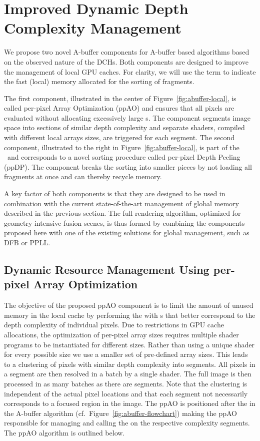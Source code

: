 \documentclass{egpubl}
\newcommand{\ab}{\mbox{A-buffer}}
\newcommand{\dch}{DCH}
\newcommand{\stencil}{ppAO}
\newcommand{\dloop}{ppDP}
\begin{document}
\section{Improved Dynamic Depth Complexity Management}
\label{sec:oit-local}

We propose two novel \ab{} components for \ab{} based algorithms based on the observed nature of the \dch{}s. 
Both components are designed to improve the management of local GPU caches. 
For clarity, we will use the term \bArray{} to indicate the fast (local) memory allocated for the sorting of fragments. 

The first component, illustrated in the center of Figure~\ref{fig:abuffer-local}, is called {per-pixel Array Optimization} (\stencil) and ensures that all pixels are evaluated without allocating excessively large \bArray{}s. 
The component segments image space into sections of similar depth complexity and separate shaders, compiled with different local arrays sizes, are triggered for each segment. 
The second component, illustrated to the right in Figure~\ref{fig:abuffer-local}, is part of the \sResolve\ and corresponds to a novel sorting procedure called per-pixel Depth Peeling (\dloop).
The component breaks the sorting into smaller pieces by not loading all fragments at once and can thereby recycle memory. 

A key factor of both components is that they are designed to be used in combination with the current state-of-the-art management of global memory described in the previous section. 
The full rendering algorithm, optimized for geometry intensive fusion scenes, is thus formed by combining the components proposed here with one of the existing solutions for global management, such as DFB or PPLL. 


\subsection{Dynamic Resource Management Using per-pixel Array Optimization}
\label{sec:ppao}

The objective of the proposed \stencil{} component is to limit the amount of unused memory in the local cache by performing the \sResolve{} with \bArray{}s that better correspond to the depth complexity of individual pixels. 
Due to restrictions in GPU cache allocations, the optimization of per-pixel array sizes requires multiple shader programs to be instantiated for different \bArray{} sizes.
Rather than using a unique shader for every possible \bArray{} size we use a smaller set of pre-defined array sizes. 
This leads to a clustering of pixels with similar depth complexity into segments. 
All pixels in a segment are then resolved in a batch by a single shader. 
The full image is then processed in as many batches as there are segments. 
Note that the clustering is independent of the actual pixel locations and that each segment not necessarily corresponds to a focused region in the image. 
The \stencil{} is positioned after the \sFill{} in the \ab{} algorithm (cf.~Figure~\ref{fig:abuffer-flowchart}) making the \stencil{} responsible for managing and calling the \sResolve{} on the respective complexity segments.
The \stencil{} algorithm is outlined below.
\end{document}
